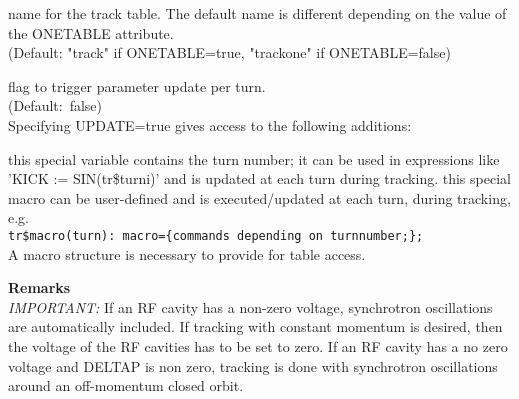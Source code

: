 \begin{madlist}
   name for the track table. The default name is different
  depending on the value of the ONETABLE attribute. \\ 
  (Default: "track" if ONETABLE=true, "trackone" if ONETABLE=false)

   flag to trigger parameter update per turn. \\  
  (Default:~false) \\
  Specifying UPDATE=true gives access to the following additions:   
  \begin{madlist}
   this special variable contains the turn number;
  it can be used in expressions like 'KICK := SIN(tr\$turni)' and is
  updated at each turn during tracking.     
    this special macro can be
    user-defined and is executed/updated at each turn, during tracking, e.g. \\
    {\tt tr\$macro(turn): macro=\{commands depending on turnnumber;\};} 
    \\ 
    A macro structure is necessary to provide for table access.
  \end{madlist}


\end{madlist}

{\bf Remarks}\\
\emph{IMPORTANT:} If an RF cavity has a non-zero voltage, synchrotron
oscillations are automatically included. If tracking with constant
momentum is desired, then the voltage of the RF cavities has to be set
to zero. If an RF cavity has a no zero voltage and DELTAP is non zero, 
tracking is done with synchrotron oscillations around an off-momentum
closed orbit.


